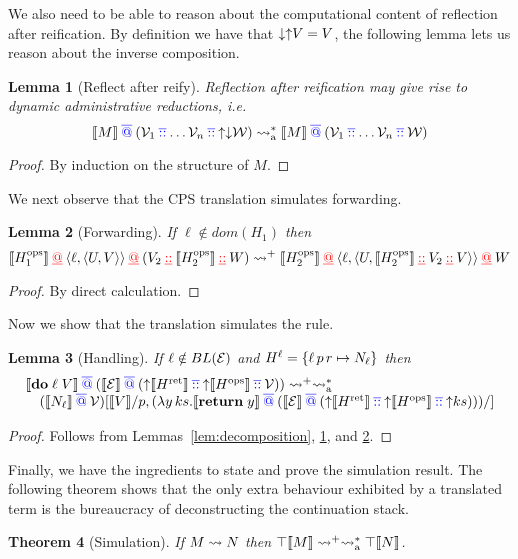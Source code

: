 \documentclass[12pt,phd,lfcs,twoside,openright,logo,leftchapter,normalheadings]{infthesis}
\theoremstyle{plain}
\newtheorem{theorem}{Theorem}[chapter]
\newtheorem{lemma}[theorem]{Lemma}
\theoremstyle{definition}
\begin{document}
We also need to be able to reason about the computational content of
reflection after reification. By definition we have that
$\mathord{\downarrow} \mathord{\uparrow} V = V$, the following lemma lets us reason about the
inverse composition.
%
\begin{lemma}[Reflect after reify]
\label{lem:reflect-after-reify}
%
Reflection after reification may give rise to dynamic administrative
reductions, i.e.
%
\[
\llbracket M \rrbracket \mathbin{{\color{blue}\overline{@}}} (\mathcal{V}_1 \mathbin{{\color{blue}\overline{::}}} \dots \mathcal{V}_n \mathbin{{\color{blue}\overline{::}}} \mathord{\uparrow} \mathord{\downarrow} \mathcal{W})
  \leadsto_{\textrm{a}}^\ast \llbracket M \rrbracket \mathbin{{\color{blue}\overline{@}}} (\mathcal{V}_1 \mathbin{{\color{blue}\overline{::}}} \dots \mathcal{V}_n \mathbin{{\color{blue}\overline{::}}} \mathcal{W})
\]
\end{lemma}
%
\begin{proof}
  By induction on the structure of $M$.
\end{proof}
%
We next observe that the CPS translation simulates forwarding.
%
\begin{lemma}[Forwarding]
\label{lem:forwarding}
If $\ell \notin dom(H_1)$ then
%
\[
    \llbracket H^{\mathrm{ops}}_1 \rrbracket \mathbin{{\color{red}\underline{@}}} \langle \ell,\langle U, V \rangle \rangle \mathbin{{\color{red}\underline{@}}} (V_2 \mathbin{{\color{red}\underline{::}}} \llbracket H^{\mathrm{ops}}_2 \rrbracket \mathbin{{\color{red}\underline{::}}} W)
\leadsto^+
    \llbracket H^{\mathrm{ops}}_2 \rrbracket \mathbin{{\color{red}\underline{@}}} \langle \ell,\langle U, \llbracket H^{\mathrm{ops}}_2 \rrbracket \mathbin{{\color{red}\underline{::}}} V_2 \mathbin{{\color{red}\underline{::}}} V \rangle \rangle \mathbin{{\color{red}\underline{@}}} W
\]
%
\end{lemma}
%
\begin{proof}
  By direct calculation.
\end{proof}
%
Now we show that the translation simulates the 
rule.
%
\begin{lemma}[Handling]
\label{lem:handle-op}
If $\ell \notin BL(\mathcal{E})$ and $H^{\ell} = \{\ell\,p\,r \mapsto N_\ell\}$ then
%
\[
\bl
\cps{\Do\;\ell\;V} \sapp (\cps{\EC} \sapp (\reflect\cps{\hret} \scons \reflect\cps{\hops} \scons \sV)) \reducesto^+\areducesto^\ast \\
\quad
    (\cps{N_\ell} \sapp \sV)[\cps{V}/p, (\lambda y\,ks.\cps{\Return\;y} \sapp (\cps{\EC} \sapp (\reflect\cps{\hret} \scons \reflect\cps{\hops} \scons \reflect ks)))/]
\el
\]
%
\end{lemma}
%
\begin{proof}
Follows from Lemmas~\ref{lem:decomposition},
\ref{lem:reflect-after-reify}, and \ref{lem:forwarding}.
\end{proof}
%
Finally, we have the ingredients to state and prove the simulation
result. The following theorem shows that the only extra behaviour
exhibited by a translated term is the bureaucracy of deconstructing
the continuation stack.
%
\begin{theorem}[Simulation]
\label{thm:ho-simulation}
If $M \leadsto N$ then $\top\llbracket M \rrbracket \leadsto^+ \leadsto_{\textrm{a}}^* \top\llbracket N \rrbracket$.
\end{theorem}
\end{document}
